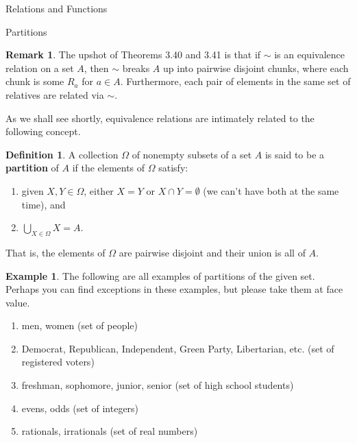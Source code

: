 \documentclass[11pt]{article}
\theoremstyle{definition}
\newtheorem{definition}[theorem]{Definition}
\newtheorem{example}[theorem]{Example}
\newtheorem{remark}[theorem]{Remark}
\begin{document}
\addtocounter{section}{2}

\begin{section}{Relations and Functions}

\addtocounter{subsection}{2}
\addtocounter{theorem}{46}

\begin{subsection}{Partitions}

\begin{remark}
The upshot of Theorems 3.40 and 3.41 is that if $\sim$ is an equivalence relation on a set $A$, then $\sim$ breaks $A$ up into pairwise disjoint chunks, where each chunk is some $R_{a}$ for $a\in A$. Furthermore, each  pair of elements in the same set of relatives are related via $\sim$.
\end{remark}

As we shall see shortly, equivalence relations are intimately related to the following concept.

\begin{definition}
A collection $\Omega$ of nonempty subsets of a set $A$ is said to be a \textbf{partition} of $A$ if the elements of $\Omega$ satisfy:
\begin{enumerate}
\item given $X,Y\in\Omega$, either $X=Y$ or $X\cap Y=\emptyset$ (we can't have both at the same time), and
\item $\displaystyle \bigcup_{X\in\Omega}X=A$.
\end{enumerate}
That is, the elements of $\Omega$ are pairwise disjoint and their union is all of $A$.
\end{definition}

\begin{example}
The following are all examples of partitions of the given set.  Perhaps you can find exceptions in these examples, but please take them at face value.
\begin{enumerate}
\item men, women (set of people)
\item Democrat, Republican, Independent, Green Party, Libertarian, etc. (set of registered voters)
\item freshman, sophomore, junior, senior (set of high school students)
\item evens, odds (set of integers)
\item rationals, irrationals (set of real numbers)
\end{enumerate}
\end{example}


\end{subsection}
\end{section}
\end{document}
